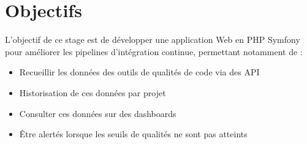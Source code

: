 	\section{Objectifs}
	L’objectif de ce stage est de développer une application Web en PHP Symfony
	pour améliorer les pipelines d’intégration continue, permettant notamment de :\\
	\begin{itemize}
		\item Recueillir les données des outils de qualités de code via des API
		\item Historisation de ces données par projet
		\item Consulter ces données sur des dashboards
		\item Être alertés lorsque les seuils de qualités ne sont pas atteints
	\end{itemize}